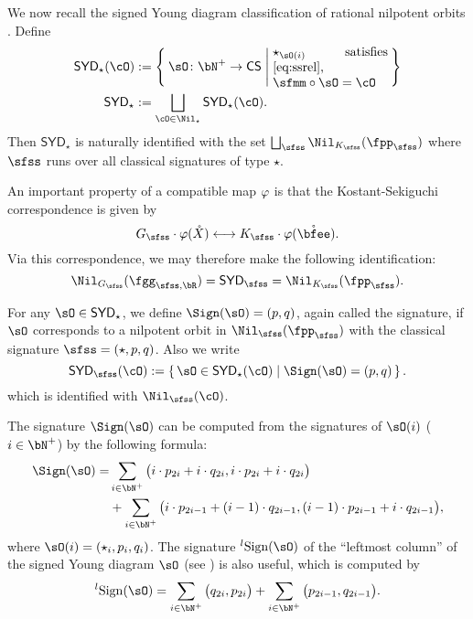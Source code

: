 \documentclass[12pt,a4paper]{amsart}
\def\SYD{{\mathsf{SYD}}}
\numberwithin{equation}{section}
\theoremstyle{remark}
\def\lsign{{}^l\mathrm{Sign}}
\begin{document}
\smallskip

We now recall the signed Young diagram classification of rational nilpotent orbits \cite[Chapter 9]{CM}.
Define
\[
  \begin{split}
  \SYD_{\star}(\cO) &:=\Set{\sO\colon \bN^{+}\rightarrow \CCSS| \begin{minipage}{9em}
      $\star_{\sO(i)}$ satisfies \eqref{eq:ssrel},\\
      $\sfmm\circ \sO = \cO$
      \end{minipage}
    }\\
    \SYD_{\star} &:= \bigsqcup_{\cO\in \Nil_{\star}} \SYD_{\star}(\cO).
  \end{split}
\]
Then $\SYD_{\star}$ is naturally identified with the set
$\bigsqcup_{\sfss}\Nil_{\Ks}(\fpp_{\sfss})$ where $\sfss$ runs over all
classical signatures of type $\star$.

\def\Gsr{G_{\sfss}}
\def\fggsr{\fgg_{\sfss,\bR}}

An important property of a compatible map $\varphi$ is that the Kostant-Sekiguchi
correspondence is given by
\[
  \Gsr \cdot \SLT(\eslt) \longleftrightarrow  \Ks\cdot \SLT(\Xslt).
\]
Via this correspondence, we may therefore make the following
identification:
\begin{equation}\label{eq:KS}
\Nil_{\Gs}(\fggsr) = \SYD_\sfss = \Nil_{\Ks}(\fpps).
\end{equation}

\smallskip

For any $\sO\in \SYD_{\star}$, we define $\Sign(\sO) = (p,q)$, again called the signature,
 if $\sO$ corresponds to a nilpotent orbit in $\Nil_{\sfss}(\fpps)$ with the classical
signature $\sfss=(\star,p,q)$. Also we write
\[
\SYD_{\sfss}(\cO) := \set{\sO\in \SYD_{\star}(\cO)| \Sign(\sO)=(p,q)}.
\]
which is identified with $\Nil_{\sfss}(\cO)$.

The signature $\Sign(\sO)$ can be computed from the signatures of $\sO(i)$ ($i\in \bN^+$)
by the following formula:
\[
  \begin{split}
    \Sign(\sO) = &
    \sum_{i\in \bN^{+}} \big(i \cdot p_{2i} + i \cdot q_{2i},
    i \cdot p_{2i}+i\cdot q_{2i}\big)\\
    &  +
    \sum_{i\in \bN^{+}} \big(i \cdot p_{2i-1} + (i-1)\cdot q_{2i-1},
    (i-1) \cdot p_{2i-1}+i \cdot q_{2i-1}\big),
  \end{split}
\]
where $\sO(i)=(\star_{i}, p_{i},q_{i})$. The signature $\lsign(\sO)$ of the ``leftmost column'' of the
signed Young diagram $\sO$ (see ) is also useful, which is computed by
\[
  \lsign(\sO) =
    \sum_{i\in \bN^{+}} \big(q_{2i},p_{2i} \big)
      + \sum_{i\in \bN^{+}} \big(p_{2i-1},q_{2i-1} \big).
\]
\end{document}
